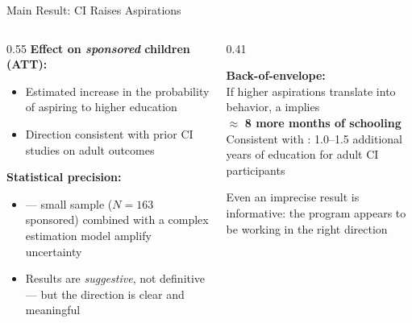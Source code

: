 \documentclass[aspectratio=169, 10pt]{beamer}
\begin{document}
\begin{frame}{Main Result: CI Raises Aspirations}
  \begin{columns}
    \begin{column}{0.55\textwidth}
      \textbf{Effect on \textit{sponsored} children (ATT):}
      \begin{itemize}
        \item Estimated  increase in the probability of aspiring to higher education
        \item Direction consistent with prior CI studies on adult outcomes \citep{Wydick2013}
      \end{itemize}
      \vspace{0.5em}
      \textbf{Statistical precision:}
      \begin{itemize}
        \item {} — small sample ($N=163$ sponsored) combined with a complex estimation model amplify uncertainty
        \item Results are \textit{suggestive}, not definitive — but the direction is clear and meaningful
      \end{itemize}
    \end{column}
    \begin{column}{0.41\textwidth}
      \begin{resultbox}
        \textbf{Back-of-envelope:}\\[0.4em]
        If higher aspirations translate into behavior, a  implies\\[0.3em]
        $\approx$ \textbf{8 more months of schooling}\\[0.3em]
        Consistent with \citet{Wydick2013}: 1.0--1.5 additional years of education for adult CI participants
      \end{resultbox}
      \vspace{0.4em}
      \begin{keybox}
        \small Even an imprecise result is informative: the program appears to be working in the right direction
      \end{keybox}
    \end{column}
  \end{columns}
\end{frame}
\end{document}

